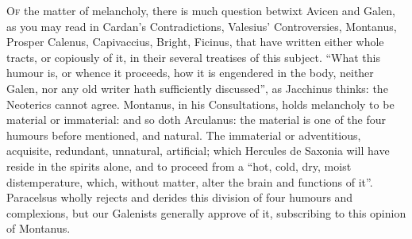 \lettrine{O}{f} the matter of melancholy, there is much question betwixt Avicen
and Galen, as you may read in Cardan's Contradictions,
Valesius' Controversies, Montanus, Prosper Calenus,
Capivaccius, Bright, Ficinus, that
have written either whole tracts, or copiously of it, in their several
treatises of this subject. \enquote{What this humour is, or whence
it proceeds, how it is engendered in the body, neither Galen, nor any old
writer hath sufficiently discussed}, as Jacchinus thinks: the Neoterics cannot
agree. Montanus, in his Consultations, holds melancholy to be material or
immaterial: and so doth Arculanus: the material is one of the four humours
before mentioned, and natural. The immaterial or adventitious, acquisite,
redundant, unnatural, artificial; which Hercules de
Saxonia will have reside in the spirits alone, and to proceed from a \enquote{hot,
cold, dry, moist distemperature, which, without matter, alter the brain and
functions of it}. Paracelsus wholly rejects and derides this division of four
humours and complexions, but our Galenists generally approve of it, subscribing
to this opinion of Montanus.

